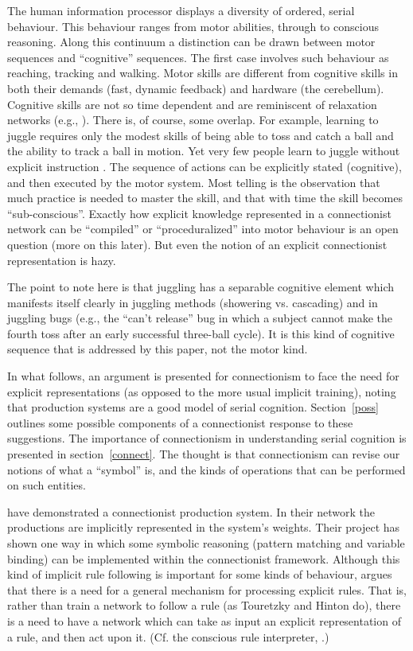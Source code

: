 The human information processor displays a diversity of ordered,
serial behaviour. This behaviour ranges from motor abilities, through
to conscious reasoning. Along this continuum a distinction can be
drawn between motor sequences and ``cognitive'' sequences.  The first
case involves such behaviour as reaching, tracking and walking.  Motor
skills are different from cognitive skills in both their demands
(fast, dynamic feedback) and hardware (the cerebellum).  Cognitive
skills are not so time dependent and are reminiscent of relaxation
networks (e.g., ). There is, of course, some
overlap.  For example, learning to juggle requires only the modest
skills of being able to toss and catch a ball and the ability to track
a ball in motion.  Yet very few people learn to juggle without
explicit instruction \cite[page 3/4]{austcomp}. The sequence of
actions can be explicitly stated (cognitive), and then executed by the
motor system. Most telling is the observation that much practice is
needed to master the skill, and that with time the skill becomes
``sub-conscious''. Exactly how explicit knowledge represented in a
connectionist network can be ``compiled'' or ``proceduralized''
\cite[page~34]{andearch} into motor behaviour is an open question
(more on this later). But even the notion of an explicit connectionist
representation is hazy.

The point to note here is that juggling has a separable cognitive
element which manifests itself clearly in juggling methods (showering
vs. cascading) and in juggling bugs (e.g., the ``can't release'' bug
\cite[page~20]{austcomp} in which a subject cannot make the
fourth toss after an early successful three-ball cycle).  It is this
kind of cognitive sequence that is addressed by this paper, not the
motor kind.

In what follows, an argument is presented for connectionism to face
the need for explicit representations (as opposed to the more usual
implicit training), noting that production systems are a good model
of serial cognition.  Section~\ref{poss} outlines some possible
components of a connectionist response to these suggestions.  The
importance of connectionism in understanding serial cognition is
presented in section~\ref{connect}.  The thought is that connectionism
can revise our notions of what a ``symbol'' is, and the kinds of
operations that can be performed on such entities.


 have demonstrated a connectionist production
system.  In their network the productions are
implicitly represented in the system's weights.  Their project has
shown one way in which some symbolic reasoning (pattern matching
and variable binding) can be implemented within the connectionist
framework.  Although this
kind of implicit rule following is important for some kinds of
behaviour,  argues that there is a need for a
general mechanism for processing explicit rules.  That is, rather
than train a network to follow a rule (as Touretzky and Hinton do),
there is a need to have a network which can take as input an
explicit representation of a rule, and then act upon it. (Cf. the
conscious rule interpreter, .)

